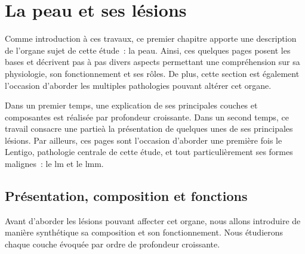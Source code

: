 \renewcommand{\thechapter}{\arabic{chapter}}
\setcounter{chapter}{0}

\chapter{La peau et ses lésions}
\label{chap:chapter_1}
\chapterintro
Comme introduction à ces travaux, ce premier chapitre apporte une description de l'organe sujet de cette étude~: la peau. Ainsi, ces quelques pages posent les bases et décrivent pas à pas divers aspects permettant une compréhension sur sa physiologie, son fonctionnement et ses rôles. De plus, cette section est également l'occasion d'aborder les multiples pathologies pouvant altérer cet organe.\par

Dans un premier temps, une explication de ses principales couches et composantes est réalisée par profondeur croissante. Dans un second temps, ce travail consacre une partieà la présentation de quelques unes de ses principales lésions. Par ailleurs, ces pages sont l'occasion d'aborder une première fois le Lentigo, pathologie centrale de cette étude, et tout particulièrement ses formes malignes~: le \acrfull{lm} et le \acrfull{lmm}.\par
\newpage

\section{Présentation, composition et fonctions}
Avant d’aborder les lésions pouvant affecter cet organe, nous allons introduire de manière synthétique sa composition et son fonctionnement. Nous étudierons chaque couche évoquée par ordre de profondeur croissante.\par

